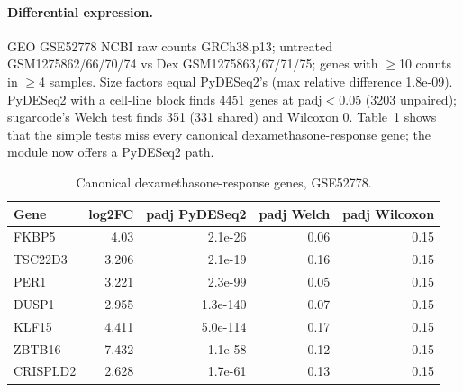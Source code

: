 \paragraph{Differential expression.} GEO GSE52778 NCBI raw counts GRCh38.p13; untreated GSM1275862/66/70/74 vs Dex GSM1275863/67/71/75; genes with $\geq$10 counts in $\geq$4 samples. Size factors equal PyDESeq2's (max relative difference 1.8e-09). PyDESeq2 with a cell-line block finds 4451 genes at padj$<$0.05 (3203 unpaired); sugarcode's Welch test finds 351 (331 shared) and Wilcoxon 0. Table~\ref{tab:dex} shows that the simple tests miss every canonical dexamethasone-response gene; the module now offers a PyDESeq2 path.
\begin{table}[h]\centering\small\caption{Canonical dexamethasone-response genes, GSE52778.}\label{tab:dex}\begin{tabular}{lrrrr}\hline Gene & log2FC & padj PyDESeq2 & padj Welch & padj Wilcoxon\\\hline
FKBP5 & 4.03 & 2.1e-26 & 0.06 & 0.15\\
TSC22D3 & 3.206 & 2.1e-19 & 0.16 & 0.15\\
PER1 & 3.221 & 2.3e-99 & 0.05 & 0.15\\
DUSP1 & 2.955 & 1.3e-140 & 0.07 & 0.15\\
KLF15 & 4.411 & 5.0e-114 & 0.17 & 0.15\\
ZBTB16 & 7.432 & 1.1e-58 & 0.12 & 0.15\\
CRISPLD2 & 2.628 & 1.7e-61 & 0.13 & 0.15\\
\hline\end{tabular}\end{table}
